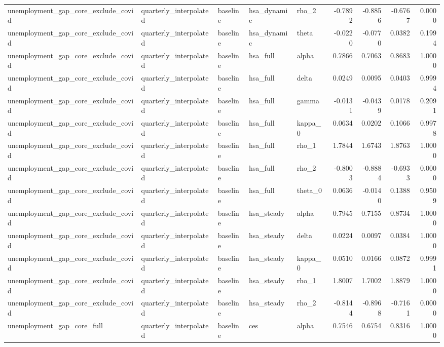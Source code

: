 \begin{tabular}{lllllrrrr}
unemployment\_gap\_core\_exclude\_covid & quarterly\_interpolated & baseline & hsa\_dynamic & rho\_2 & -0.7892 & -0.8856 & -0.6767 & 0.0000 \\
unemployment\_gap\_core\_exclude\_covid & quarterly\_interpolated & baseline & hsa\_dynamic & theta & -0.0220 & -0.0770 & 0.0382 & 0.1994 \\
unemployment\_gap\_core\_exclude\_covid & quarterly\_interpolated & baseline & hsa\_full & alpha & 0.7866 & 0.7063 & 0.8683 & 1.0000 \\
unemployment\_gap\_core\_exclude\_covid & quarterly\_interpolated & baseline & hsa\_full & delta & 0.0249 & 0.0095 & 0.0403 & 0.9994 \\
unemployment\_gap\_core\_exclude\_covid & quarterly\_interpolated & baseline & hsa\_full & gamma & -0.0131 & -0.0439 & 0.0178 & 0.2091 \\
unemployment\_gap\_core\_exclude\_covid & quarterly\_interpolated & baseline & hsa\_full & kappa\_0 & 0.0634 & 0.0202 & 0.1066 & 0.9978 \\
unemployment\_gap\_core\_exclude\_covid & quarterly\_interpolated & baseline & hsa\_full & rho\_1 & 1.7844 & 1.6743 & 1.8763 & 1.0000 \\
unemployment\_gap\_core\_exclude\_covid & quarterly\_interpolated & baseline & hsa\_full & rho\_2 & -0.8003 & -0.8884 & -0.6933 & 0.0000 \\
unemployment\_gap\_core\_exclude\_covid & quarterly\_interpolated & baseline & hsa\_full & theta\_0 & 0.0636 & -0.0140 & 0.1388 & 0.9509 \\
unemployment\_gap\_core\_exclude\_covid & quarterly\_interpolated & baseline & hsa\_steady & alpha & 0.7945 & 0.7155 & 0.8734 & 1.0000 \\
unemployment\_gap\_core\_exclude\_covid & quarterly\_interpolated & baseline & hsa\_steady & delta & 0.0224 & 0.0097 & 0.0384 & 1.0000 \\
unemployment\_gap\_core\_exclude\_covid & quarterly\_interpolated & baseline & hsa\_steady & kappa\_0 & 0.0510 & 0.0166 & 0.0872 & 0.9991 \\
unemployment\_gap\_core\_exclude\_covid & quarterly\_interpolated & baseline & hsa\_steady & rho\_1 & 1.8007 & 1.7002 & 1.8879 & 1.0000 \\
unemployment\_gap\_core\_exclude\_covid & quarterly\_interpolated & baseline & hsa\_steady & rho\_2 & -0.8144 & -0.8968 & -0.7161 & 0.0000 \\
unemployment\_gap\_core\_full & quarterly\_interpolated & baseline & ces & alpha & 0.7546 & 0.6754 & 0.8316 & 1.0000 \\

\end{tabular}

